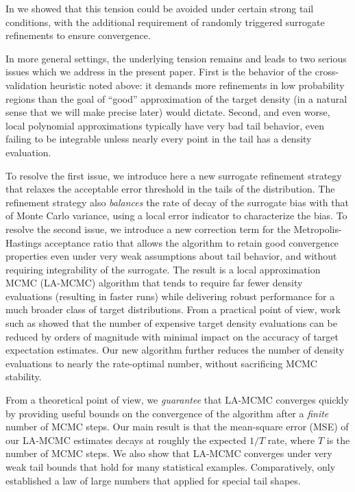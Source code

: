 In \citet{Conradetal2016, Conradetal2018} we showed that this tension could be avoided under certain strong tail conditions, with the additional requirement of randomly triggered surrogate refinements to ensure convergence. 

In more general settings, the underlying tension remains and leads to two serious issues which we address in the present paper.
%
First is the behavior of the cross-validation heuristic noted above: %
it demands more refinements in low probability regions than the goal of ``good'' approximation of the target density (in a natural sense that we will make precise later) would dictate. Second, and even worse, local polynomial approximations typically have very bad tail behavior, even failing to be integrable unless nearly every point in the tail has a density evaluation. 

To resolve the first issue, we introduce here a new surrogate refinement strategy that relaxes the acceptable error threshold in the tails of the distribution. The refinement strategy also \emph{balances} the rate of decay of the surrogate bias with that of Monte Carlo variance, using a local error indicator to characterize the bias. To resolve the second issue, we introduce a new correction term for the Metropolis-Hastings acceptance ratio that allows the algorithm to retain good convergence properties even under very weak assumptions about tail behavior, and without requiring integrability of the surrogate. 
%
The result is a local approximation MCMC (LA-MCMC) algorithm that tends to require far fewer density evaluations (resulting in faster runs) while delivering robust performance for a much broader class of target distributions. From a practical point of view, work such as \citet{Conradetal2016, Conradetal2018, Angelikopoulosetal2015} showed that the number of expensive target density evaluations can be reduced by orders of magnitude with minimal impact on the accuracy of target expectation estimates. Our new algorithm further reduces the number of density evaluations to nearly the rate-optimal number, without sacrificing MCMC stability.

From a theoretical point of view, we \textit{guarantee} that LA-MCMC converges quickly by providing useful bounds on the convergence of the algorithm after a \textit{finite} number of MCMC steps.  Our main result is that the mean-square error (MSE) of our LA-MCMC estimates decays at roughly the expected $1/T$ rate, where $T$ is the number of MCMC steps. We also show that LA-MCMC converges under very weak tail bounds that hold for many statistical examples. Comparatively, \citet{Conradetal2016} only established a law of large numbers that applied for special tail shapes. 

